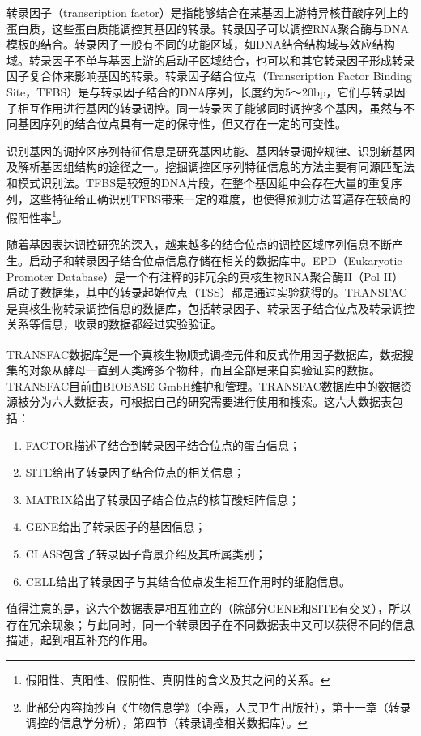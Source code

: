 \documentclass[11pt,a4paper,twoside]{book}
\begin{document}
转录因子（transcription factor）是指能够结合在某基因上游特异核苷酸序列上的蛋白质，这些蛋白质能调控其基因的转录。转录因子可以调控RNA聚合酶与DNA模板的结合。转录因子一般有不同的功能区域，如DNA结合结构域与效应结构域。转录因子不单与基因上游的启动子区域结合，也可以和其它转录因子形成转录因子复合体来影响基因的转录。转录因子结合位点（Transcription Factor Binding Site，TFBS）是与转录因子结合的DNA序列，长度约为5～20bp，它们与转录因子相互作用进行基因的转录调控。同一转录因子能够同时调控多个基因，虽然与不同基因序列的结合位点具有一定的保守性，但又存在一定的可变性。

识别基因的调控区序列特征信息是研究基因功能、基因转录调控规律、识别新基因及解析基因组结构的途径之一。挖掘调控区序列特征信息的方法主要有同源匹配法和模式识别法。TFBS是较短的DNA片段，在整个基因组中会存在大量的重复序列，这些特征给正确识别TFBS带来一定的难度，也使得预测方法普遍存在较高的假阳性率\footnote{假阳性、真阳性、假阴性、真阴性的含义及其之间的关系。}。

随着基因表达调控研究的深入，越来越多的结合位点的调控区域序列信息不断产生。启动子和转录因子结合位点信息存储在相关的数据库中。EPD（Eukaryotic Promoter Database）是一个有注释的非冗余的真核生物RNA聚合酶II（Pol II）启动子数据集，其中的转录起始位点（TSS）都是通过实验获得的。TRANSFAC是真核生物转录调控信息的数据库，包括转录因子、转录因子结合位点及转录调控关系等信息，收录的数据都经过实验验证。

TRANSFAC数据库\footnote{此部分内容摘抄自《生物信息学》（李霞，人民卫生出版社），第十一章（转录调控的信息学分析），第四节（转录调控相关数据库）。}是一个真核生物顺式调控元件和反式作用因子数据库，数据搜集的对象从酵母一直到人类跨多个物种，而且全部是来自实验证实的数据。TRANSFAC目前由BIOBASE GmbH维护和管理。TRANSFAC数据库中的数据资源被分为六大数据表，可根据自己的研究需要进行使用和搜索。这六大数据表包括：
\begin{enumerate}
  \item FACTOR描述了结合到转录因子结合位点的蛋白信息；
  \item SITE给出了转录因子结合位点的相关信息；
  \item MATRIX给出了转录因子结合位点的核苷酸矩阵信息；
  \item GENE给出了转录因子的基因信息；
  \item CLASS包含了转录因子背景介绍及其所属类别；
  \item CELL给出了转录因子与其结合位点发生相互作用时的细胞信息。
\end{enumerate}
值得注意的是，这六个数据表是相互独立的（除部分GENE和SITE有交叉），所以存在冗余现象；与此同时，同一个转录因子在不同数据表中又可以获得不同的信息描述，起到相互补充的作用。
\end{document}
